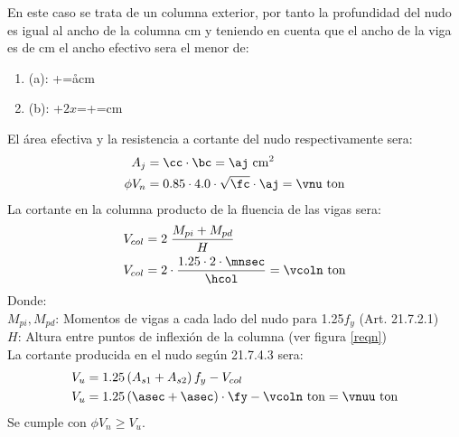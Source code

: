 \noindent 
En este caso se trata de un columna exterior, por tanto la profundidad del nudo es igual al ancho de la columna \bc cm y teniendo en cuenta que el ancho de la viga es de \bsec cm el ancho efectivo sera el menor de:
\begin{enumerate}
\item[] (a): \bsec+\bc=\aa cm
\item[] (b): \bsec+$2x$=\bsec+\xx=\bb cm
\end{enumerate}
\FPmin\cc{\aa}{\bb}
El área efectiva y la resistencia a cortante del nudo respectivamente sera:
\begin{align*}
A_{j}&=\cc\cdot\bc=\aj \mathrm{~cm^2}\\
\phi V_{n}&=0.85\cdot4.0\cdot\sqrt{\fc}\cdot\aj=\vnu \mathrm{~ton}
\end{align*}
\noindent La cortante en la columna producto de la fluencia de las vigas sera:
\FPset{}
\FPeval{}
\begin{align}
V_{col}&=2\;\frac{M_{pi}+M_{pd}}{H}\\
V_{col}&=2\cdot\frac{1.25\cdot2\cdot\mnsec}{\hcol}=\vcoln\notag \mathrm{~ton}
\end{align}
\noindent
Donde:\\
$M_{pi},M_{pd}$: Momentos de vigas a cada lado del nudo para 1.25$f_{y}$ (Art. 21.7.2.1)\\
$H$: Altura entre puntos de inflexión de la columna (ver figura \ref{reqn})\\
\noindent La cortante producida en el nudo según 21.7.4.3 sera:
\begin{align}
V_{u}&=1.25\left ( A_{s1}+A_{s2} \right )f_{y}-V_{col}\\
V_{u}&=1.25\left ( \asec+\asec \right )\cdot \fy-\vcoln \mathrm{~ton}=\vnuu\mathrm{~ton}\notag
\end{align}
\noindent Se cumple con $\phi V_{n}\geq V_{u}$.
